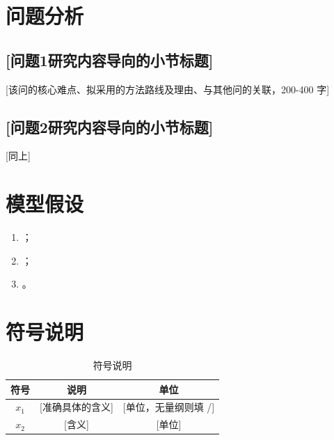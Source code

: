 \documentclass[12pt,a4paper]{ctexart}
\begin{document}
\section{问题分析}


\subsection{[问题1研究内容导向的小节标题]}

[该问的核心难点、拟采用的方法路线及理由、与其他问的关联，200-400 字]

\subsection{[问题2研究内容导向的小节标题]}

[同上]

\section{模型假设}

\begin{enumerate}[label=\arabic*., leftmargin=2em]
    \item [假设内容，1-2 句]；
    \item [假设内容]；
    \item [假设内容]。
\end{enumerate}

\section{符号说明}

\begin{table}[H]
\centering
\caption{符号说明}
\begin{tabular}{ccc}
\toprule
符号 & 说明 & 单位 \\
\midrule
$x_1$ & [准确具体的含义] & [单位，无量纲则填 /] \\
$x_2$ & [含义] & [单位] \\
\bottomrule
\end{tabular}
\end{table}
\end{document}
